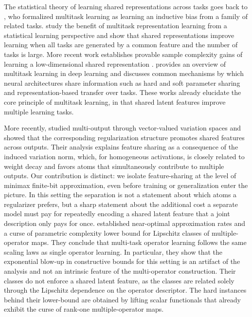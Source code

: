 \documentclass[twoside,11pt]{article}
\begin{document}
The statistical theory of learning shared representations across tasks goes back to \cite{Baxter00ModelInductiveBias}, who formalized multitask learning as learning an inductive bias from a family of related tasks. \cite{Maurer16BenefitMultitaskRepresentation} study the benefit of multitask representation learning from a statistical learning perspective and show that shared representations improve learning when all tasks are generated by a common feature and the number of tasks is large. More recent work establishes provable sample complexity gains of learning a low-dimensional shared 
representation \citep{Tripuraneni21ProvableMetaLearningLinear, Du21FewShotLearningLearning}. \cite{Ruder17OverviewMultiTaskLearning} provides an overview of multitask learning in deep learning and discusses common mechanisms by which neural architectures share information such as hard and soft parameter sharing and representation-based transfer over tasks. These works already elucidate the core principle of multitask learning, in that shared latent features improve multiple learning tasks.

More recently, \cite{Shenouda24VariationSpacesMultioutput} studied multi-output through vector-valued variation spaces and showed that the corresponding regularization structure promotes shared features across outputs. Their analysis explains feature sharing as a consequence of the induced variation norm, which, for homogeneous activations, is closely related to weight decay and favors atoms that simultaneously contribute to multiple outputs. Our contribution is distinct: we isolate feature-sharing at the level of minimax finite-bit approximation, even before training or generalization enter the picture. In this setting the separation is not a statement about which atoms a regularizer prefers, but a sharp statement about the additional cost a separate model must pay for repeatedly encoding a shared latent feature that a joint description only pays for once. \cite{Weihs26MultipleNeuralOperators} established near-optimal approximation rates and a curse of parametric complexity lower bound for Lipschitz classes of multiple-operator maps. They conclude that multi-task operator learning follows the same scaling laws as single operator learning. In particular, they show that the exponential blow-up in constructive bounds for this setting is an artifact of the analysis and not an intrinsic feature of the multi-operator construction. Their classes do not enforce a shared latent feature, as the classes are related solely through the Lipschitz dependence on the operator descriptor. The hard instances behind their lower-bound are obtained by lifting scalar functionals that already exhibit the curse of rank-one multiple-operator maps.
\end{document}

